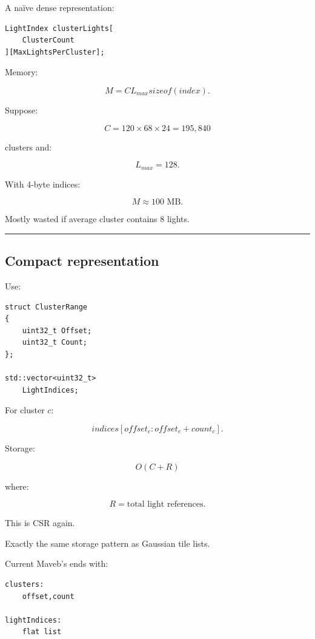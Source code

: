 A naïve dense representation:

\begin{verbatim}
LightIndex clusterLights[
    ClusterCount
][MaxLightsPerCluster];
\end{verbatim}

Memory:

\[
M=
C
L_{max}
sizeof(index).
\]

Suppose:

\[
C=120\times68\times24
=
195,840
\]

clusters and:

\[
L_{max}=128.
\]

With 4-byte indices:

\[
M\approx100\text{ MB}.
\]

Mostly wasted if average cluster contains 8 lights.

\begin{center}\rule{0.5\linewidth}{0.5pt}\end{center}

\subsection{Compact representation}\label{04-visual-computing-ii-ch040-compact-representation}

\hypertarget{04-visual-computing-ii-ch040-compact-representation}{}

Use:

\begin{verbatim}
struct ClusterRange
{
    uint32_t Offset;
    uint32_t Count;
};

std::vector<uint32_t>
    LightIndices;
\end{verbatim}

For cluster \(c\):

\[
indices[
offset_c:
offset_c+count_c
].
\]

Storage:

\[
O(C+R)
\]

where:

\[
R=
\text{total light references}.
\]

This is CSR again.

Exactly the same storage pattern as Gaussian tile lists.

Current Maveb's  ends with:

\begin{verbatim}
clusters:
    offset,count

lightIndices:
    flat list
\end{verbatim}

